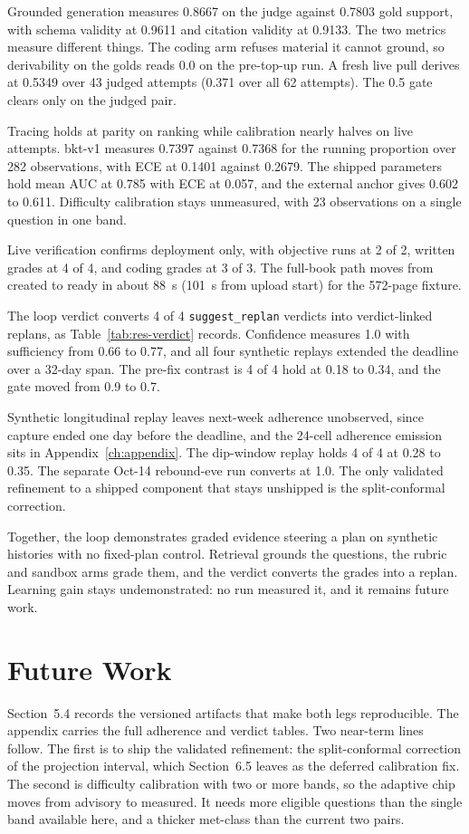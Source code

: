 Grounded generation measures 0.8667 on the judge against 0.7803 gold support, with schema validity at 0.9611 and citation validity at 0.9133. The two metrics measure different things. The coding arm refuses material it cannot ground, so derivability on the golds reads 0.0 on the pre-top-up run. A fresh live pull derives at 0.5349 over 43 judged attempts (0.371 over all 62 attempts). The 0.5 gate clears only on the judged pair.

Tracing holds at parity on ranking while calibration nearly halves on live attempts. bkt-v1 measures 0.7397 against 0.7368 for the running proportion over 282 observations, with ECE at 0.1401 against 0.2679. The shipped parameters hold mean AUC at 0.785 with ECE at 0.057, and the external anchor gives 0.602 to 0.611. Difficulty calibration stays unmeasured, with 23 observations on a single question in one band.

Live verification confirms deployment only, with objective runs at 2 of 2, written grades at 4 of 4, and coding grades at 3 of 3. The full-book path moves from created to ready in about 88~s (101~s from upload start) for the 572-page fixture.

The loop verdict converts 4 of 4 \texttt{suggest\_replan} verdicts into verdict-linked replans, as Table~\ref{tab:res-verdict} records. Confidence measures 1.0 with sufficiency from 0.66 to 0.77, and all four synthetic replays extended the deadline over a 32-day span. The pre-fix contrast is 4 of 4 hold at 0.18 to 0.34, and the gate moved from 0.9 to 0.7.

Synthetic longitudinal replay leaves next-week adherence unobserved, since capture ended one day before the deadline, and the 24-cell adherence emission sits in Appendix~\ref{ch:appendix}. The dip-window replay holds 4 of 4 at 0.28 to 0.35. The separate Oct-14 rebound-eve run converts at 1.0. The only validated refinement to a shipped component that stays unshipped is the split-conformal correction.

Together, the loop demonstrates graded evidence steering a plan on synthetic histories with no fixed-plan control. Retrieval grounds the questions, the rubric and sandbox arms grade them, and the verdict converts the grades into a replan. Learning gain stays undemonstrated: no run measured it, and it remains future work.

\section{Future Work}
Section~5.4 records the versioned artifacts that make both legs reproducible. The appendix carries the full adherence and verdict tables. Two near-term lines follow. The first is to ship the validated refinement: the split-conformal correction of the projection interval, which Section~6.5 leaves as the deferred calibration fix. The second is difficulty calibration with two or more bands, so the adaptive chip moves from advisory to measured. It needs more eligible questions than the single band available here, and a thicker met-class than the current two pairs.

